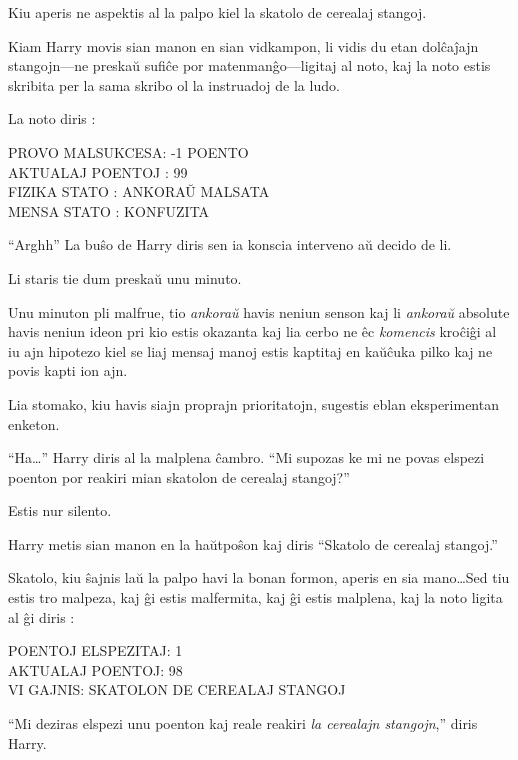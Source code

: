 Kiu aperis ne aspektis al la palpo kiel la skatolo de cerealaj stangoj.

Kiam Harry movis sian manon en sian vidkampon, li vidis du etan
dolĉaĵajn stangojn—ne preskaŭ sufiĉe por matenmanĝo—ligitaj al noto, kaj
la noto estis skribita per la sama skribo ol la instruadoj de la ludo.

La noto diris :
\medskip

\begin{center}
  PROVO MALSUKCESA: -1 POENTO\\
  AKTUALAJ POENTOJ : 99\\
  FIZIKA STATO : ANKORAŬ MALSATA\\
  MENSA STATO : KONFUZITA\\
\end{center}

\medskip

``Arghh'' La buŝo de Harry diris sen ia konscia interveno aŭ decido de
li.

Li staris tie dum preskaŭ unu minuto.

Unu minuton pli malfrue, tio \emph{ankoraŭ} havis neniun senson kaj li
\emph{ankoraŭ} absolute havis neniun ideon pri kio estis okazanta kaj
lia cerbo ne êc \emph{komencis} kroĉiĝi al iu ajn hipotezo kiel se
liaj mensaj manoj estis kaptitaj en kaŭĉuka pilko kaj ne povis
kapti ion ajn.  

Lia stomako, kiu havis siajn proprajn prioritatojn, sugestis eblan
eksperimentan enketon.

``Ha\ldots'' Harry diris al la malplena ĉambro. ``Mi supozas ke mi ne povas
elspezi poenton por reakiri mian skatolon de cerealaj stangoj?''

Estis nur silento.

Harry metis sian manon en la haŭtpoŝon kaj diris ``Skatolo de cerealaj stangoj.''

Skatolo, kiu ŝajnis laŭ la palpo havi la bonan formon, aperis en sia
mano\ldots Sed tiu estis tro malpeza, kaj ĝi estis malfermita, kaj ĝi
estis malplena, kaj la noto ligita al ĝi diris :

\medskip
\begin{center}
  POENTOJ ELSPEZITAJ: 1\\
  AKTUALAJ POENTOJ: 98\\
  VI GAJNIS: SKATOLON DE CEREALAJ STANGOJ\\
\end{center}

``Mi deziras elspezi unu poenton kaj reale reakiri \emph{la cerealajn
stangojn},'' diris Harry.

